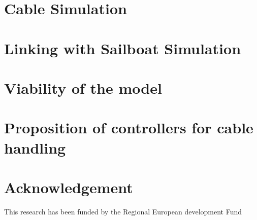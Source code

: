 \documentclass[11pt]{article} %
\begin{document}
\section{Cable Simulation}


\section{Linking with Sailboat Simulation}


\section{Viability of the model}



\section{Proposition of controllers for cable handling}



\section*{Acknowledgement}

This research has been funded by the Regional European development Fund
%


\nocite{*}


\end{document}
